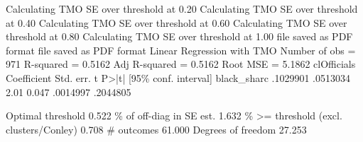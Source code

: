 Calculating TMO SE over threshold at 0.20
Calculating TMO SE over threshold at 0.40
Calculating TMO SE over threshold at 0.60
Calculating TMO SE over threshold at 0.80
Calculating TMO SE over threshold at 1.00
file{} saved as PDF format
file{} saved as PDF format
{\smallskip}
Linear Regression with TMO                              Number of obs =    971
                                                        R-squared     = 0.5162
                                                        Adj R-squared = 0.5162
                                                        Root MSE      = 5.1862
{\smallskip}
c{\tytilde}lOfficials {\VBAR} Coefficient  Std. err.      t    P>|t|     [95\% conf. interval]
black_shar{\tytilde}c {\VBAR}   .1029901   .0513034     2.01   0.047     .0014997    .2044805
                                                                               
                                                   Optimal threshold      0.522
                                            \% of off-diag in SE est.      1.632
                              \% >= threshold (excl. clusters/Conley)      0.708
                                                          \# outcomes     61.000
                                                  Degrees of freedom     27.253
